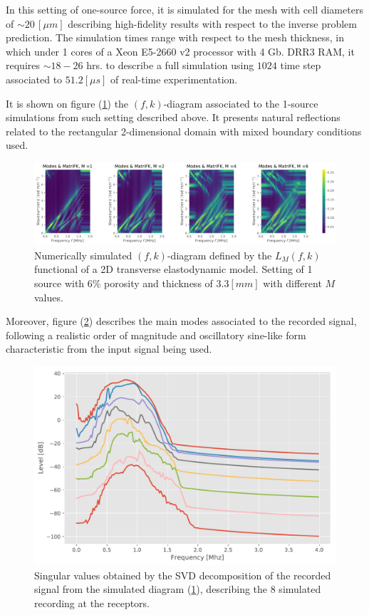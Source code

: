\begin{rem}
In this setting of one-source force, it is simulated for the mesh with cell diameters of $\sim 20 \, [\mu m]$ describing high-fidelity results with respect to the inverse problem prediction. The simulation times range with respect to the mesh thickness, in which under 1 cores of a Xeon E5-2660 v2 processor with 4 Gb. DRR3 RAM, it requires $\sim 18-26$ hrs. to describe a full simulation using $1024$ time step associated to $51.2 [\mu s]$ of real-time experimentation.
\end{rem}
It is shown on figure (\ref{FK-DiagramS1P6M33}) the $(f,k)$-diagram associated to the 1-source simulations from such setting described above. It presents natural reflections related to the rectangular 2-dimensional domain with mixed boundary conditions used.
\begin{figure}[!h]
	\centering
	\includegraphics[width=\textwidth]{images/TimeSingSous/2DTime_P6ElasticFK33M1460_y.pdf}
	\caption{Numerically simulated $(f,k)$-diagram defined by the $L_M(f,k)$ functional of a 2D transverse elastodynamic model. Setting of 1 source with $6\%$ porosity and thickness of $3.3 [mm]$ with different $M$ values.}
	\label{FK-DiagramS1P6M33}
\end{figure}

Moreover, figure (\ref{SVD-S1P6M33}) describes the main modes associated to the recorded signal, following a realistic order of magnitude and oscillatory sine-like form characteristic from the input signal being used.
\begin{figure}[!h]
	\centering
	\includegraphics[scale=.5]{images/TimeSingSous/2DTime_P6Elastic33_SV.pdf}
	\caption{Singular values obtained by the SVD decomposition of the recorded signal from the simulated diagram (\ref{FK-DiagramS1P6M33}), describing the 8 simulated recording at the receptors.}
	\label{SVD-S1P6M33}
\end{figure}

